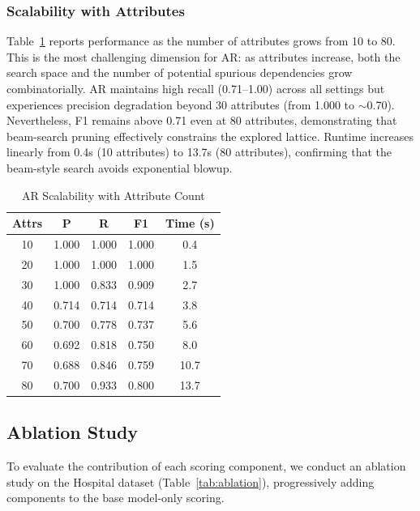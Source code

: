 \documentclass[conference]{IEEEtran}
\begin{document}
\subsubsection{Scalability with Attributes}
Table~\ref{tab:attrs} reports performance as the number of attributes grows from 10 to 80. This is the most challenging dimension for AR: as attributes increase, both the search space and the number of potential spurious dependencies grow combinatorially. AR maintains high recall (0.71--1.00) across all settings but experiences precision degradation beyond 30 attributes (from 1.000 to $\sim$0.70). Nevertheless, F1 remains above 0.71 even at 80 attributes, demonstrating that beam-search pruning effectively constrains the explored lattice. Runtime increases linearly from 0.4s (10 attributes) to 13.7s (80 attributes), confirming that the beam-style search avoids exponential blowup.

\begin{table}[t]
\caption{AR Scalability with Attribute Count}
\label{tab:attrs}
\centering
\begin{tabular}{ccccc}
\toprule
\textbf{Attrs} & \textbf{P} & \textbf{R} & \textbf{F1} & \textbf{Time (s)} \\
\midrule
10 & 1.000 & 1.000 & 1.000 & 0.4 \\
20 & 1.000 & 1.000 & 1.000 & 1.5 \\
30 & 1.000 & 0.833 & 0.909 & 2.7 \\
40 & 0.714 & 0.714 & 0.714 & 3.8 \\
50 & 0.700 & 0.778 & 0.737 & 5.6 \\
60 & 0.692 & 0.818 & 0.750 & 8.0 \\
70 & 0.688 & 0.846 & 0.759 & 10.7 \\
80 & 0.700 & 0.933 & 0.800 & 13.7 \\
\bottomrule
\end{tabular}
\end{table}

\subsection{Ablation Study}\label{sec:exp_ablation}

To evaluate the contribution of each scoring component, we conduct an ablation study on the Hospital dataset (Table~\ref{tab:ablation}), progressively adding components to the base model-only scoring.
\end{document}
